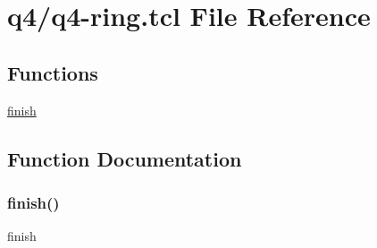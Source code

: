 \hypertarget{q4-ring_8tcl}{}\section{q4/q4-\/ring.tcl File Reference}
\label{q4-ring_8tcl}
\subsection*{Functions}
\begin{DoxyCompactItemize}
\item 
\hyperlink{q4-ring_8tcl_a30728837c246b65ef76298af0101d99c}{finish}
\end{DoxyCompactItemize}


\subsection{Function Documentation}
\mbox{\label{q4-ring_8tcl_a30728837c246b65ef76298af0101d99c}} 
\subsubsection{\texorpdfstring{finish()}{finish()}}
{\footnotesize\ttfamily finish}

